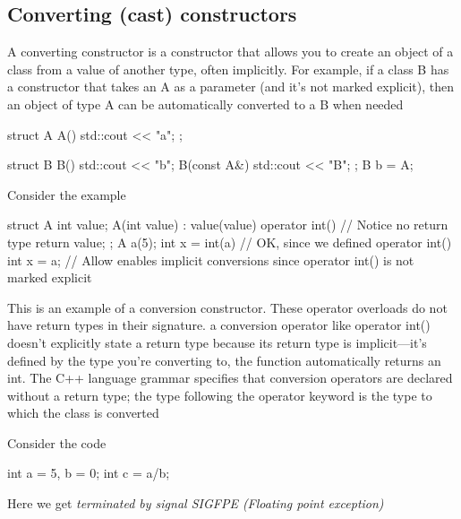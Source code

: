 \documentclass{report}
\begin{document}
    \subsection{Converting (cast) constructors}
    \bigbreak \noindent 
    A converting constructor is a constructor that allows you to create an object of a class from a value of another type, often implicitly. For example, if a class B has a constructor that takes an A as a parameter (and it's not marked explicit), then an object of type A can be automatically converted to a B when needed
    \bigbreak \noindent 
    \begin{cppcode}
        struct A {
            A() { std::cout << "a"; }
        };

        struct B {
            B() { std::cout << "b"; }
            B(const A&) { std::cout << "B"; }
        };
        B b = A{};
    \end{cppcode}
    \bigbreak \noindent 
    Consider the example
    \bigbreak \noindent 
    \begin{cppcode}
        struct A {
            int value;   
            A(int value) : value(value) {}
            operator int() { // Notice no return type
                return value;
            }
        };
        A a(5);
        int x = int(a) // OK, since we defined operator int()  
        int x = a; // Allow enables implicit conversions since operator int() is not marked explicit
    \end{cppcode}
    \bigbreak \noindent 
    This is an example of a conversion constructor. These operator overloads  do not have return types in their signature. a conversion operator like operator int() doesn’t explicitly state a return type because its return type is implicit—it’s defined by the type you're converting to, the function automatically returns an int. 
    \bigbreak \noindent 
    The C++ language grammar specifies that conversion operators are declared without a return type; the type following the operator keyword is the type to which the class is converted

    \pagebreak 
    \bigbreak \noindent 
    Consider the code
    \bigbreak \noindent 
    \begin{cppcode}
    int a = 5, b = 0;
    int c = a/b;
    \end{cppcode}
    \bigbreak \noindent 
    Here we get \textit{terminated by signal SIGFPE (Floating point exception)}
\end{document}
